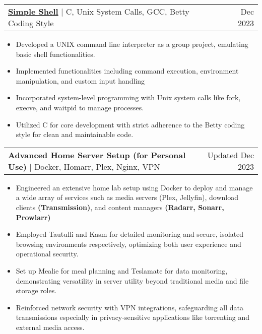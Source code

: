 \documentclass[letterpaper,10.5pt]{article}
\makeatletter
\newcommand{\resumeItem}[1]{
  \item\small{
    {#1 \vspace{-2pt}}
  }
}
\newcommand{\resumeProjectHeading}[2]{
    \vspace{-2pt}\item
    \begin{tabular*}{0.97\textwidth}{l@{\extracolsep{\fill}}r}
      \small#1 & #2 \\
    \end{tabular*}\vspace{-7pt}
}
\newcommand{\resumeItemListStart}{\begin{itemize}}
\newcommand{\resumeItemListEnd}{\end{itemize}\vspace{-5pt}}
\makeatother
\begin{document}
      \resumeProjectHeading
        {\href{https://github.com/Hassan220022/simple_shell}{\textbf{Simple Shell}}
        $|$
          {C, Unix System Calls, GCC, Betty Coding Style}}{Dec 2023}
          \resumeItemListStart
            \resumeItem{Developed a UNIX command line interpreter as a group project, emulating basic shell functionalities.}
            \resumeItem{Implemented functionalities including command execution, environment manipulation, and custom input handling}
            \resumeItem{Incorporated system-level programming with Unix system calls like fork, execve, and waitpid to manage processes.}
            \resumeItem{Utilized C for core development with strict adherence to the Betty coding style for clean and maintainable code.}
          \resumeItemListEnd
      \resumeProjectHeading
        {\vspace{3pt}\textbf{Advanced Home Server Setup (for Personal Use)}
          $|$
            {Docker, Homarr, Plex, Nginx, VPN}}{Updated Dec 2023}
            \resumeItemListStart
              \resumeItem{Engineered an extensive home lab setup using Docker to deploy and manage a wide array of services such as media servers (Plex, Jellyfin), download clients \textbf{(Transmission)}, and content managers \textbf{(Radarr, Sonarr, Prowlarr)}}
              \resumeItem{Employed Tautulli and Kasm for detailed monitoring and secure, isolated browsing environments respectively, optimizing both user experience and operational security.}
              \resumeItem{Set up Mealie for meal planning and Teslamate for data monitoring, demonstrating versatility in server utility beyond traditional media and file storage roles.}
              \resumeItem{Reinforced network security with VPN integrations, safeguarding all data transmissions especially in privacy-sensitive applications like torrenting and external media access.}
            \resumeItemListEnd
\end{document}
